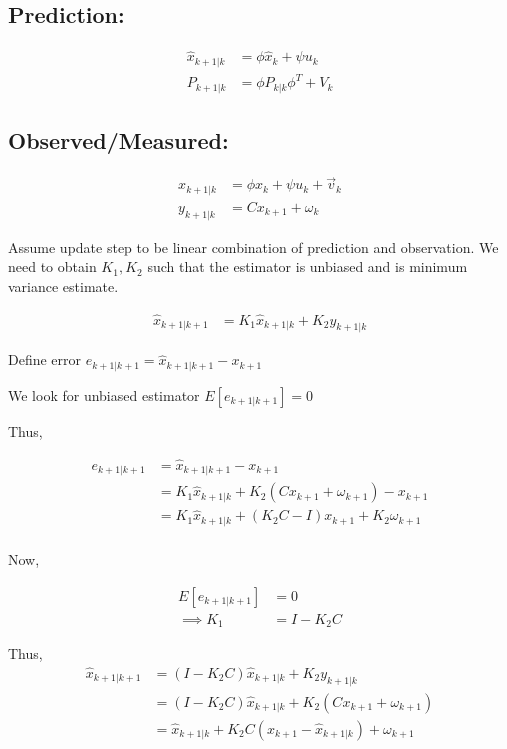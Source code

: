 \documentclass[12pt]{article}
\begin{document}
\subsection*{Prediction:}
\begin{align*}
\hat{x}_{k+1|k} &= \phi \hat{x}_k + \psi u_k\\
P_{k+1|k} &= \phi P_{k|k} \phi^T + V_k
\end{align*}

\subsection*{Observed/Measured:}

\begin{align*}
x_{k+1|k} &= \phi x_k + \psi u_k + \vec{v}_k\\
y_{k+1|k} &= Cx_{k+1} + \omega_k 
\end{align*}

Assume update step to be linear combination of prediction and observation. We need to obtain $K_1, K_2$  such that the estimator is unbiased and is minimum variance estimate.

\begin{align*}
\hat{x}_{k+1|k+1} &= K_1 \hat{x}_{k+1|k} + K_2 y_{k+1|k}
\end{align*}

Define error $e_{k+1|k+1} = \hat{x}_{k+1|k+1} - x_{k+1}$

We look for unbiased estimator $E[e_{k+1|k+1}]=0$

Thus,

\begin{align*}
e_{k+1|k+1} &= \hat{x}_{k+1|k+1} - x_{k+1}\\
&= K_1 \hat{x}_{k+1|k} +K_2(Cx_{k+1}+\omega_{k+1}) - x_{k+1}\\
&= K_1 \hat{x}_{k+1|k} +(K_2C-I)x_{k+1} + K_2\omega_{k+1}\\
\end{align*}

Now, 

\begin{align*}
E[e_{k+1|k+1}] &=0\\
\implies K_1 &= I-K_2C
\end{align*}


Thus, 
\begin{align*}
\hat{x}_{k+1|k+1} &= (I-K_2C) \hat{x}_{k+1|k} + K_2 y_{k+1|k}\\
&= (I-K_2C) \hat{x}_{k+1|k} + K_2(Cx_{k+1}+\omega_{k+1})\\
&= \hat{x}_{k+1|k} + K_2C(x_{k+1}-\hat{x}_{k+1|k}) + \omega_{k+1}
\end{align*}
\end{document}
